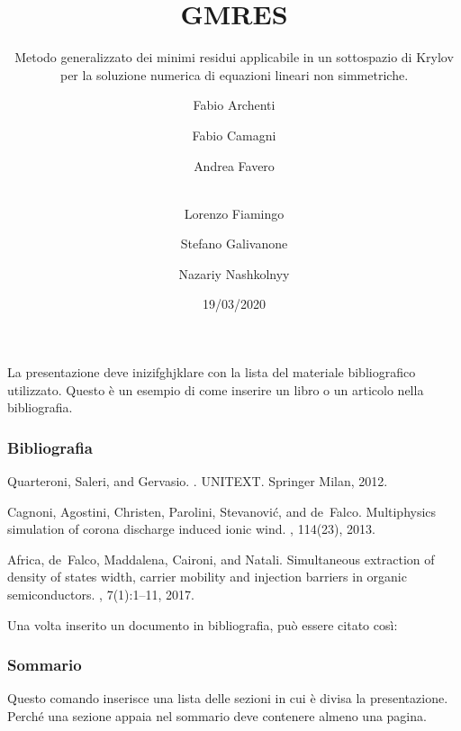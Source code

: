 \documentclass[10pt]{beamer}
\begin{document}
\begin{frame}
  \title{GMRES}
  \subtitle{Metodo generalizzato dei minimi residui applicabile in un sottospazio di Krylov per la soluzione numerica di equazioni lineari non simmetriche.}
  \date{19/03/2020}
  \author[Principal]{Fabio Archenti \and Fabio Camagni \and Andrea Favero \and  \\Lorenzo Fiamingo \and Stefano Galivanone \and Nazariy Nashkolnyy}
  \maketitle
\end{frame}


\begin{frame}

La presentazione deve inizifghjklare con la lista del materiale
bibliografico utilizzato. Questo è un esempio di come inserire 
un libro o un articolo nella bibliografia.
  \frametitle{Bibliografia}
  \begin{thebibliography}{99}\small
    
    Quarteroni, Saleri, and Gervasio.
    .
    \newblock UNITEXT. Springer Milan, 2012.

    Cagnoni, Agostini, Christen, Parolini, Stevanovi{\'c}, and de~Falco.
    \newblock Multiphysics simulation of corona discharge induced ionic wind.
    , 114(23), 2013.

   Africa, de~Falco, Maddalena, Caironi, and Natali.
   \newblock Simultaneous extraction of density of states width, carrier mobility
   and injection barriers in organic semiconductors.
   , 7(1):1--11, 2017.

   \end{thebibliography}

Una volta inserito un documento in bibliografia, 
può essere citato così:~\cite{quarteroni2012calcolo}
  
\end{frame}  

\begin{frame}
  \frametitle{Sommario}
  Questo comando inserisce una lista delle sezioni in
  cui è divisa la presentazione. Perché una sezione appaia 
  nel sommario deve contenere almeno una pagina.
  \tableofcontents
\end{frame}
\end{document}
